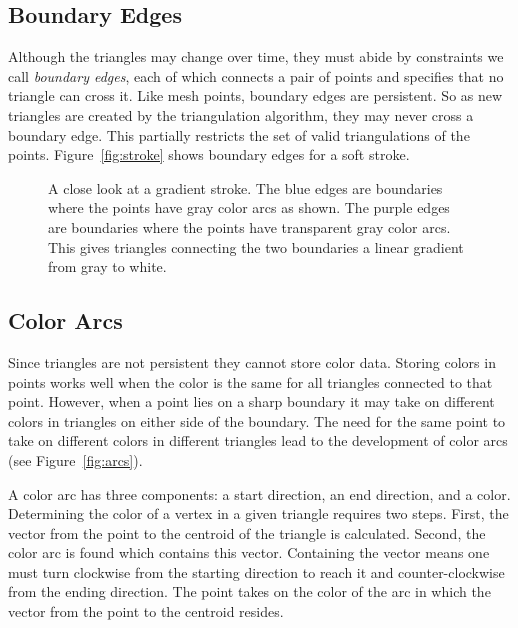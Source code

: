 \documentclass[review,draft]{acmsiggraph}
\begin{document}
\subsection{Boundary Edges}
Although the triangles may change over time, they must abide by constraints we call
\emph{boundary edges}, each of which connects a pair of points and specifies that no triangle
can cross it. Like mesh points, boundary edges are persistent. 
%
So as new triangles are created by the triangulation algorithm, they
may never cross a boundary edge.  
This partially restricts the set of valid triangulations of the points.  Figure~\ref{fig:stroke} shows boundary edges for a soft  stroke.

\begin{figure}[t]
    \centering
    \caption{A close look at a gradient stroke. The blue edges are boundaries where
    the points have gray color arcs as shown. The purple edges are boundaries where
    the points have transparent gray color arcs. This gives triangles connecting the two boundaries
    a linear gradient from gray to white.}
    \label{fig:softarcs}
\end{figure}

\subsection{Color Arcs}
Since triangles are not persistent they cannot store color data.
Storing colors in points works well when the color is the same for all triangles connected
to that point. However, when a point lies on a sharp boundary it may take on different colors in
triangles on either side of the boundary. The need for the same point to take on different
colors in different triangles lead to the development of color arcs (see Figure~\ref{fig:arcs}).

A color arc has three components: a start direction, an end direction, and a color. 
Determining the color of a vertex in a given triangle requires two steps. First,
the vector from the point to the centroid of the triangle is calculated. Second,
the color arc is found which contains this vector. Containing the vector means one must turn
clockwise from the starting direction to reach it and counter-clockwise from the ending direction.
The point takes on the color of the arc in which the vector from the point to the centroid resides.
\end{document}
